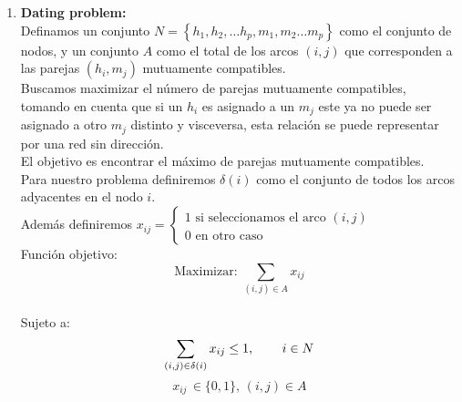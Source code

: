 \documentclass[a4paper, 12pt]{article}
\newcommand{\ds}{\displaystyle}
\begin{document}
\begin{enumerate}
      \item {\bfseries Dating problem: }
            \\ Definamos un conjunto  $ N = \ds \left\{ h_1, h_2, \dots h_p,m_1,m_2 \dots m_p  \right\}$ como el conjunto de nodos, y un conjunto $A$ como el total de los arcos $(i,j)$ que corresponden a las parejas $(h_i,m_j)$ mutuamente compatibles.
            \\ Buscamos maximizar el número de parejas mutuamente compatibles, tomando en cuenta que si un $h_i$ es asignado a un $m_j$ este ya no puede ser asignado a otro $m_j$ distinto y visceversa, esta relación se puede representar por una red sin dirección.
            \\ El objetivo es encontrar el máximo de parejas mutuamente compatibles.
            \\ Para nuestro problema definiremos $\delta(i)$ como el conjunto de todos los arcos adyacentes en el nodo $i$.
            \\ Además definiremos $x_{ij} = \left\{ \begin{array}{l} \text{1 si seleccionamos el arco } (i,j) \\ \text{0 en otro caso} \end{array} \right. $
            \\ Función objetivo:
            \[ \ds  \text{Maximizar: } \sum_{(i,j) \in A}  {x_{ij}} \]
            \\ Sujeto a:
            \[ \sum_{(i,j) \in \delta(i)} {x_{ij}} \leq 1, \hspace{0.3in} i \in N\]
            \[ x_{ij} \, \in \{ 0,1 \}, \, (i,j) \in A \]

            \begin{center}
\end{center}
\end{enumerate}
\end{document}
